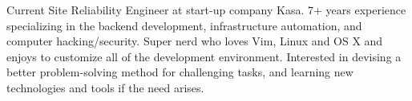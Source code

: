 

\begin{cvparagraph}

Current Site Reliability Engineer at start-up company Kasa. 7+ years experience specializing in the backend development, infrastructure automation, and computer hacking/security. Super nerd who loves Vim, Linux and OS X and enjoys to customize all of the development environment. Interested in devising a better problem-solving method for challenging tasks, and learning new technologies and tools if the need arises.
\end{cvparagraph}
